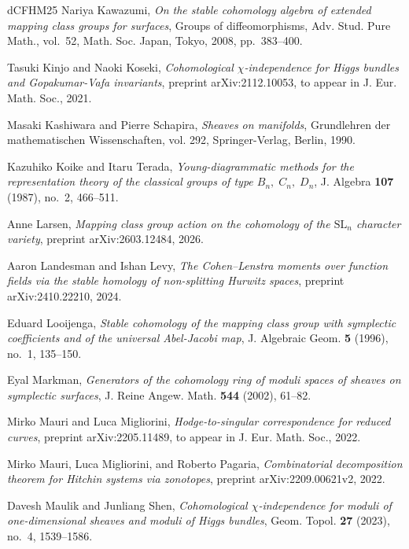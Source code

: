 \documentclass[11pt,reqno]{amsart}
\theoremstyle{plain} %
\theoremstyle{definition}
\begin{document}
\begin{thebibliography}{dCFHM25}
Nariya Kawazumi, \emph{On the stable cohomology algebra of extended mapping
  class groups for surfaces}, Groups of diffeomorphisms, Adv. Stud. Pure Math.,
  vol.~52, Math. Soc. Japan, Tokyo, 2008, pp.~383--400. 

Tasuki Kinjo and Naoki Koseki, \emph{Cohomological $\chi$-independence for
  {H}iggs bundles and {G}opakumar-{V}afa invariants}, preprint
  arXiv:2112.10053, to appear in J. Eur. Math. Soc., 2021.

Masaki Kashiwara and Pierre Schapira, \emph{Sheaves on manifolds}, Grundlehren
  der mathematischen Wissenschaften, vol. 292, Springer-Verlag, Berlin, 1990.

Kazuhiko Koike and Itaru Terada, \emph{Young-diagrammatic methods for the
  representation theory of the classical groups of type {$B_n,\;C_n,\;D_n$}},
  J. Algebra \textbf{107} (1987), no.~2, 466--511. 

Anne Larsen, \emph{Mapping class group action on the cohomology of the
  $\mathrm{SL}_n$ character variety}, preprint arXiv:2603.12484, 2026.

Aaron Landesman and Ishan Levy, \emph{The {C}ohen--{L}enstra moments over
  function fields via the stable homology of non-splitting {H}urwitz spaces},
  preprint arXiv:2410.22210, 2024.

Eduard Looijenga, \emph{Stable cohomology of the mapping class group with
  symplectic coefficients and of the universal {A}bel-{J}acobi map}, J.
  Algebraic Geom. \textbf{5} (1996), no.~1, 135--150. 

Eyal Markman, \emph{Generators of the cohomology ring of moduli spaces of
  sheaves on symplectic surfaces}, J. Reine Angew. Math. \textbf{544} (2002),
  61--82. 

Mirko Mauri and Luca Migliorini, \emph{Hodge-to-singular correspondence for
  reduced curves}, preprint arXiv:2205.11489, to appear in J. Eur. Math. Soc.,
  2022.

Mirko Mauri, Luca Migliorini, and Roberto Pagaria, \emph{Combinatorial
  decomposition theorem for {H}itchin systems via zonotopes}, preprint
  arXiv:2209.00621v2, 2022.

Davesh Maulik and Junliang Shen, \emph{Cohomological {$\chi$}-independence for
  moduli of one-dimensional sheaves and moduli of {H}iggs bundles}, Geom.
  Topol. \textbf{27} (2023), no.~4, 1539--1586. 


\end{thebibliography}
\end{document}
